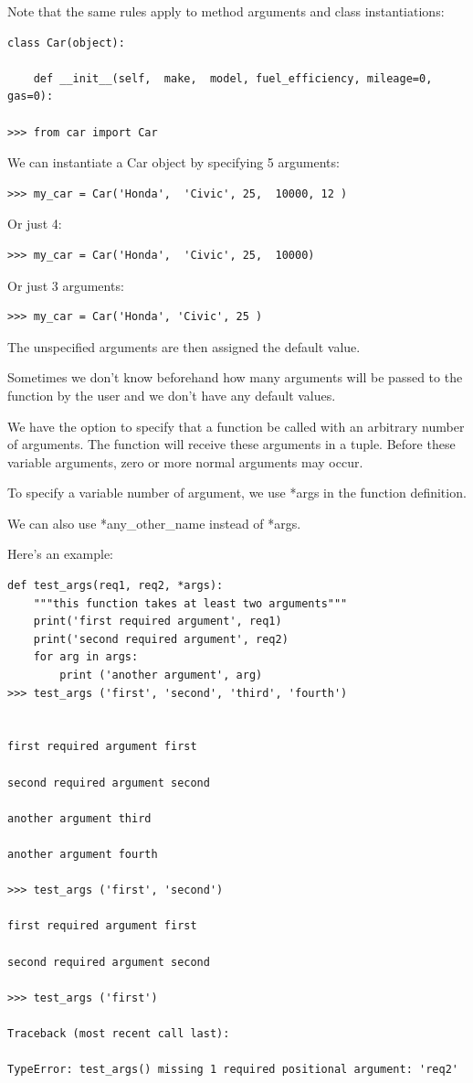 \documentclass{article}
\begin{document}
Note that the same rules apply to method arguments and class instantiations:

\begin{lstlisting}
class Car(object):

    def __init__(self,  make,  model, fuel_efficiency, mileage=0, gas=0):

>>> from car import Car
\end{lstlisting}

We can instantiate a Car object by specifying 5 arguments:

\begin{lstlisting}
>>> my_car = Car('Honda',  'Civic', 25,  10000, 12 )
\end{lstlisting}

Or just 4:
\begin{lstlisting}
>>> my_car = Car('Honda',  'Civic', 25,  10000)
\end{lstlisting}

Or just 3 arguments:

\begin{lstlisting}
>>> my_car = Car('Honda', 'Civic', 25 )
\end{lstlisting}

The unspecified arguments are then assigned the default value.

Sometimes we don't know beforehand how many arguments will be passed to the function by the user and we don't have any default values.

We have the option to specify that a function be called with an arbitrary number of arguments. The function will receive these arguments in a tuple. Before these variable arguments, zero or more normal arguments may occur.

To specify a variable number of argument, we use *args in the function definition.

We can also use *any{\_}other{\_}name instead of *args.

Here's an example:

\begin{lstlisting}
def test_args(req1, req2, *args):
    """this function takes at least two arguments"""
    print('first required argument', req1)
    print('second required argument', req2)
    for arg in args:
        print ('another argument', arg)
>>> test_args ('first', 'second', 'third', 'fourth')


first required argument first

second required argument second

another argument third

another argument fourth

>>> test_args ('first', 'second')

first required argument first

second required argument second

>>> test_args ('first')

Traceback (most recent call last):

TypeError: test_args() missing 1 required positional argument: 'req2'
\end{lstlisting}
\end{document}
